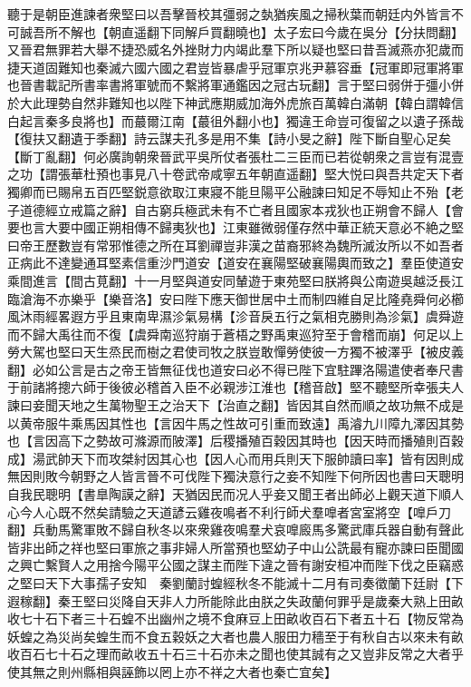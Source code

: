 聽于是朝臣進諫者衆堅曰以吾擊晉校其彊弱之埶猶疾風之掃秋葉而朝廷内外皆言不可誠吾所不解也【朝直遥翻下同解戶買翻曉也】太子宏曰今歲在吳分【分扶問翻】又晉君無罪若大舉不捷恐威名外挫財力内竭此羣下所以疑也堅曰昔吾滅燕亦犯歲而捷天道固難知也秦滅六國六國之君豈皆暴虐乎冠軍京兆尹慕容垂【冠軍即冠軍將軍也晉書載記所書率書將軍號而不繫將軍通鑑因之冠古玩翻】言于堅曰弱併于彊小併於大此理勢自然非難知也以陛下神武應期威加海外虎旅百萬韓白滿朝【韓白謂韓信白起言秦多良將也】而蕞爾江南【蕞徂外翻小也】獨違王命豈可復留之以遺子孫哉【復扶又翻遺于季翻】詩云謀夫孔多是用不集【詩小旻之辭】陛下斷自聖心足矣【斷丁亂翻】何必廣詢朝衆晉武平吳所仗者張杜二三臣而已若從朝衆之言豈有混壹之功【謂張華杜預也事見八十卷武帝咸寧五年朝直遥翻】堅大悦曰與吾共定天下者獨卿而已賜帛五百匹堅鋭意欲取江東寢不能旦陽平公融諫曰知足不辱知止不殆【老子道德經立戒篇之辭】自古窮兵極武未有不亡者且國家本戎狄也正朔會不歸人【會要也言大要中國正朔相傳不歸夷狄也】江東雖微弱僅存然中華正統天意必不絶之堅曰帝王歷數豈有常邪惟德之所在耳劉禪豈非漢之苗裔邪終為魏所滅汝所以不如吾者正病此不達變通耳堅素信重沙門道安【道安在襄陽堅破襄陽輿而致之】羣臣使道安乘間進言【間古莧翻】十一月堅與道安同輦遊于東苑堅曰朕將與公南遊吳越泛長江臨滄海不亦樂乎【樂音洛】安曰陛下應天御世居中土而制四維自足比隆堯舜何必櫛風沐雨經畧遐方乎且東南卑濕沴氣易構【沴音戾五行之氣相克勝則為沴氣】虞舜遊而不歸大禹往而不復【虞舜南巡狩崩于蒼梧之野禹東巡狩至于會稽而崩】何足以上勞大駕也堅曰天生烝民而樹之君使司牧之朕豈敢憚勞使彼一方獨不被澤乎【被皮義翻】必如公言是古之帝王皆無征伐也道安曰必不得已陛下宜駐蹕洛陽遣使者奉尺書于前諸將摠六師于後彼必稽首入臣不必親涉江淮也【稽音啟】堅不聽堅所幸張夫人諫曰妾聞天地之生萬物聖王之治天下【治直之翻】皆因其自然而順之故功無不成是以黄帝服牛乘馬因其性也【言因牛馬之性故可引重而致遠】禹濬九川障九澤因其勢也【言因高下之勢故可滌源而陂澤】后稷播殖百穀因其時也【因天時而播殖則百穀成】湯武帥天下而攻桀紂因其心也【因人心而用兵則天下服帥讀曰率】皆有因則成無因則敗今朝野之人皆言晉不可伐陛下獨決意行之妾不知陛下何所因也書曰天聰明自我民聰明【書臯陶謨之辭】天猶因民而况人乎妾又聞王者出師必上觀天道下順人心今人心既不然矣請驗之天道諺云雞夜鳴者不利行師犬羣嘷者宮室將空【嘷戶刀翻】兵動馬驚軍敗不歸自秋冬以來衆雞夜鳴羣犬哀嘷廄馬多驚武庫兵器自動有聲此皆非出師之祥也堅曰軍旅之事非婦人所當預也堅幼子中山公詵最有寵亦諫曰臣聞國之興亡繫賢人之用捨今陽平公國之謀主而陛下違之晉有謝安桓冲而陛下伐之臣竊惑之堅曰天下大事孺子安知　秦劉蘭討蝗經秋冬不能滅十二月有司奏徵蘭下廷尉【下遐稼翻】秦王堅曰災降自天非人力所能除此由朕之失政蘭何罪乎是歲秦大熟上田畝收七十石下者三十石蝗不出幽州之境不食麻豆上田畝收百石下者五十石【物反常為妖蝗之為災尚矣蝗生而不食五穀妖之大者也農人服田力穡至于有秋自古以來未有畝收百石七十石之理而畝收五十石三十石亦未之聞也使其誠有之又豈非反常之大者乎使其無之則州縣相與誣飾以罔上亦不祥之大者也秦亡宜矣】

